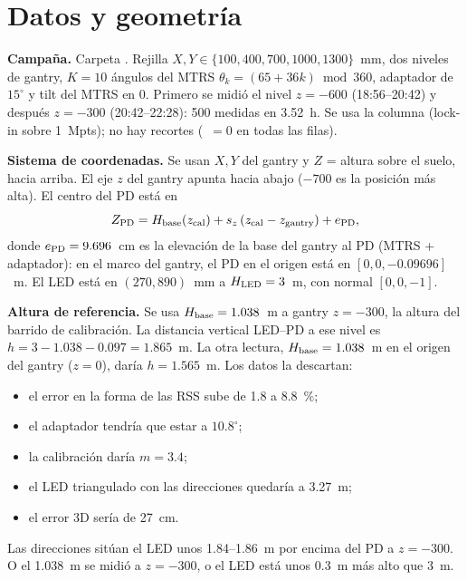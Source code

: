 \documentclass[11pt,a4paper]{article}
\begin{document}
\begin{abstract}
Con la geometría nominal y SQ, el error medio es de 3.6~cm a la altura de la calibración, pero de 12~cm a $z=-600$, con un sesgo vertical de $-11.5$~cm. La triangulación con sólo las direcciones y la amplitud indican, de forma independiente, que el nivel $z=-600$ está unos 10~cm más bajo que lo nominal: unos 200~mm de recorrido vertical en lugar de 300~mm. Con esa geometría ($s_z=0.667$), SQ + NLS da 4.8~cm de error medio sin calibrar el offset y 3.65~cm con el offset calibrado una vez. El error crece poco al reducir $K$: con $K=5$ es prácticamente el de $K=10$, y con $K=3$ sube a 4.7--5.8~cm, sin fallos. La geometría debe comprobarse con una medición física de la altura del PD.
\end{abstract}

\section{Datos y geometría}
\textbf{Campaña.} Carpeta . Rejilla $X,Y\in\{100,400,700,1000,1300\}$~mm, dos niveles de gantry, $K=10$ ángulos del MTRS $\theta_k=(65+36k)\bmod 360$, adaptador de $15^\circ$ y tilt del MTRS en 0. Primero se midió el nivel $z=-600$ (18:56--20:42) y después $z=-300$ (20:42--22:28): 500 medidas en 3.52~h. Se usa la columna  (lock-in sobre 1~Mpts); no hay recortes (~$=0$ en todas las filas).

\textbf{Sistema de coordenadas.} Se usan $X,Y$ del gantry y $Z$ = altura sobre el suelo, hacia arriba. El eje $z$ del gantry apunta hacia abajo ($-700$ es la posición más alta). El centro del PD está en
\begin{equation}
Z_{\rm PD}=H_{\rm base}(z_{\rm cal})+s_z\,(z_{\rm cal}-z_{\rm gantry})+e_{\rm PD},
\end{equation}
donde $e_{\rm PD}=9.696$~cm es la elevación de la base del gantry al PD (MTRS + adaptador): en el marco del gantry, el PD en el origen está en $[0,0,-0.09696]$~m. El LED está en $(270,890)$~mm a $H_{\rm LED}=3$~m, con normal $[0,0,-1]$.

\textbf{Altura de referencia.} Se usa $H_{\rm base}=1.038$~m a gantry $z=-300$, la altura del barrido de calibración. La distancia vertical LED--PD a ese nivel es $h=3-1.038-0.097=1.865$~m. La otra lectura, $H_{\rm base}=1.038$~m en el origen del gantry ($z=0$), daría $h=1.565$~m. Los datos la descartan:
\begin{itemize}
\item el error en la forma de las RSS sube de 1.8 a 8.8~\%;
\item el adaptador tendría que estar a $10.8^\circ$;
\item la calibración daría $m=3.4$;
\item el LED triangulado con las direcciones quedaría a 3.27~m;
\item el error 3D sería de 27~cm.
\end{itemize}
Las direcciones sitúan el LED unos 1.84--1.86~m por encima del PD a $z=-300$. O el 1.038~m se midió a $z=-300$, o el LED está unos 0.3~m más alto que 3~m.
\end{document}
